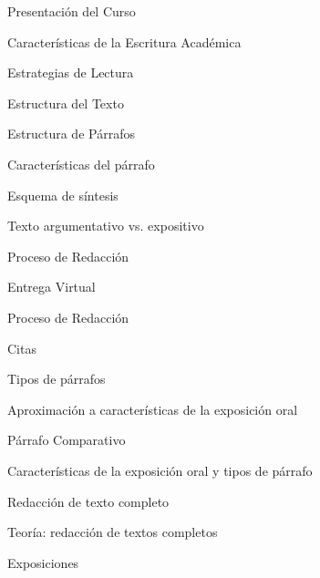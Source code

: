 \documentclass[a4paper,8pt]{article}
\begin{document}
\begin{sumilla}
\item Presentación del Curso
\item Características de la Escritura Académica
\item Estrategias de Lectura
\item Estructura del Texto
\item Estructura de Párrafos
\item Características del párrafo
\item Esquema de síntesis
\item Texto argumentativo vs. expositivo
\item Proceso de Redacción
\item Entrega Virtual
\item Proceso de Redacción
\item Citas
\item Tipos de párrafos
\item Aproximación a características de la exposición oral
\item Párrafo Comparativo
\item Características de la exposición oral y tipos de párrafo
\item Redacción de texto completo
\item Teoría: redacción de textos completos
\item Exposiciones

\end{sumilla}

\begin{competenciasAsignatura}
\item {}
\item {}
\item {}

\end{competenciasAsignatura}
\end{document}
